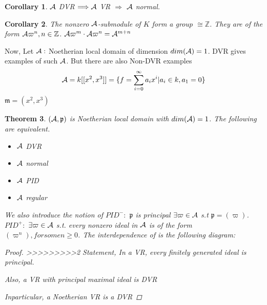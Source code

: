 \documentclass[11pt]{article}
\newtheorem{thm}{Theorem}[section]
\newtheorem{cor}[thm]{Corollary}
\newcommand{\intg}{\mathbb Z}
\newcommand{\scm}{{\mathfrak m}}
\newcommand{\scp}{{\mathfrak p}}
\newcommand{\cala}{{\cal A}}
\newcommand{\Lrta}{\Longrightarrow}
\begin{document}
\begin{cor}
$\cala$ DVR $\Lrta \cala$ VR $\Lrta $ $\cala$ normal.
\end{cor}

\begin{cor}
The nonzero $\cala$-submodule of $K$ form a group $\cong \intg$. They are of the form $\cala\varpi^n, n\in \intg$. $\cala\varpi^m\cdot \cala\varpi^n=\cala^{m+n}$
\end{cor}

Now, Let $\cala:$ Noetherian local domain of dimension $dim(\cala)=1$. DVR gives examples of such $\cala$. But there are also Non-DVR examples
$$
\cala=k[[x^2,x^3]]=\{f=\sum^{\infty}_{i=0}a_i x^i|a_i\in k, a_1=0\}
$$
$\scm=(x^2,x^3)$

\begin{thm} $(\cala,\scp)$ is Noetherian local domain with $dim(\cala)=1$.  
The following are equivalent.
\begin{itemize}
\item $\cala$ DVR
\item $\cala$ normal
\item $\cala$ PID
\item $\cala$ regular
\end{itemize}

We also introduce the notion of $PID^-:$ $\scp$ is principal $\exists \varpi\in \cala$ s.t $\scp=(\varpi)$.\\
 $PID^{+}:$ $\exists \varpi \in\cala$ s.t. every nonzero ideal in $\cala$ is of the form $(\varpi^n), for some n\geq 0$.
The interdependence of is the following diagram:

\begin{proof}
>>>>>>>>>2
Statement, In a VR, every finitely generated ideal is principal. 

Also, a VR with principal maximal  ideal is DVR

Inparticular, a Noetherian VR is  a DVR
\end{proof}
\end{thm}
\end{document}
